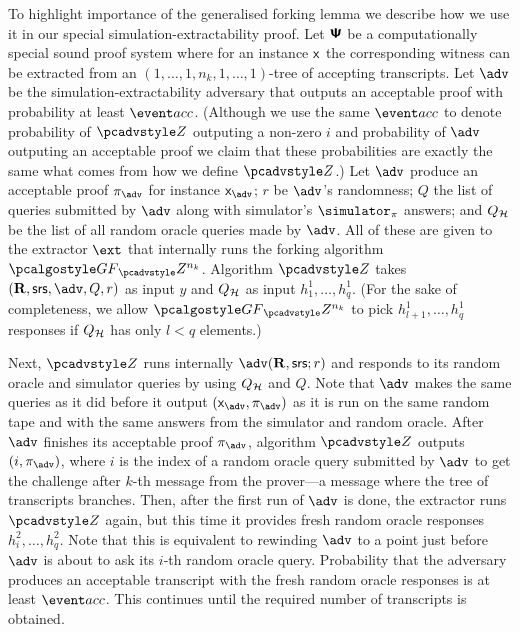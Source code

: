 \documentclass[runningheads,11pt]{llncs}
\begin{document}
To highlight importance of the generalised forking lemma we describe how we use
it in our special simulation-extractability proof.  Let $\bm{\mathsf{\Psi}}$ be a
computationally special sound proof system where for an instance $\mathsf{x}$ the
corresponding witness can be extracted from an
$(1, \ldots, 1, n_k, 1, \ldots, 1)$-tree of accepting transcripts.  Let $\advse$
be the simulation-extractability adversary that outputs an acceptable proof with
probability at least $\accProb$. (Although we use the same $\accProb$ to denote
probability of $\zdv$ outputing a non-zero $i$ and probability of $\advse$
outputing an acceptable proof we claim that these probabilities are exactly the
same what comes from how we define $\zdv$.)  Let $\advse$ produce an acceptable
proof $\zkproof_{\advse}$ for instance $\inp_{\advse}$; $r$ be $\advse$'s
randomness; $Q$ the list of queries submitted by $\advse$ along with simulator's
$\simulator_\zkproof$ answers; and $Q_{\mathcal{H}}$ be the list of all random oracle
queries made by $\advse$.  All of these are given to the extractor $\ext$ that
internally runs the forking algorithm $\genforking_\zdv^{n_k}$.  Algorithm $\zdv$
takes $(\REL, \srs, \advse,
Q, r)$ as input $y$ and $Q_{\mathcal{H}}$ as input $h_1^1, \ldots,
h_q^1$. 
(For the sake of completeness, we allow $\genforking_\zdv^{n_k}$ to
pick $h^1_{l + 1}, \ldots, h^1_q$ responses if $Q_{\mathcal{H}}$ has only $l < q$
elements.)  

Next, $\zdv$ runs internally $\advse(\REL, \srs; r)$ and responds to its random
oracle and simulator queries by using $Q_{\mathcal{H}}$ and $Q$. Note that $\advse$ makes
the same queries as it did before it output $(\inp_{\advse}, \zkproof_{\advse})$
as it is run on the same random tape and with the same answers from the
simulator and random oracle. After $\advse$ finishes its acceptable proof
$\zkproof_{\advse}$, algorithm $\zdv$ outputs $(i, \zkproof_{\advse})$, where
$i$ is the index of a random oracle query submitted by $\advse$ to get the challenge after
$k$-th message from the prover---a message where the tree of transcripts
branches.
Then, after the first run of $\advse$ is done, the extractor runs $\zdv$ again,
but this time it provides fresh random oracle responses $h^2_i, \ldots,
h^2_q$. Note that this is equivalent to rewinding $\advse$ to a point just
before $\advse$ is about to ask its $i$-th random oracle
query. Probability that the adversary produces an acceptable transcript with the
fresh random oracle responses is at least $\accProb$. This continues until the
required number of transcripts is obtained. 
\end{document}
